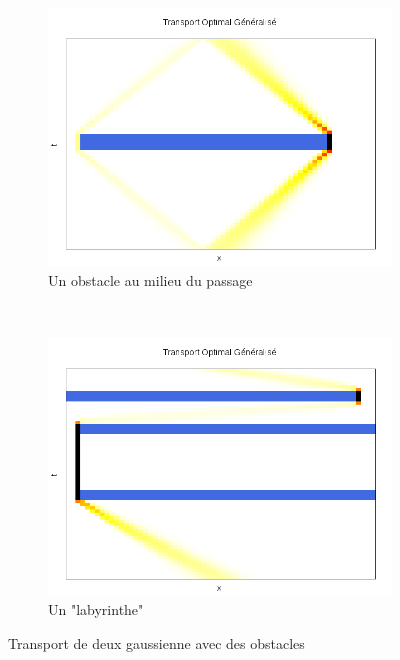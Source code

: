 \documentclass{beamer}
\begin{document}
\begin{frame}
\begin{figure}[!h]
\centering 
	\begin{subfigure}[b]{0.48\linewidth}
	\includegraphics[width=\textwidth]{img/1DObstacle/resultat.png}
	\caption{Un obstacle au milieu du passage}
	\end{subfigure}
	~
	\begin{subfigure}[b]{0.48\linewidth}
	\includegraphics[width=\textwidth]{img/1DLabyrinthe/resultat.png}
	\caption{Un "labyrinthe"}
	\end{subfigure}	
	\caption{Transport de deux gaussienne avec des obstacles}
\end{figure}
\end{frame}
\end{document}
